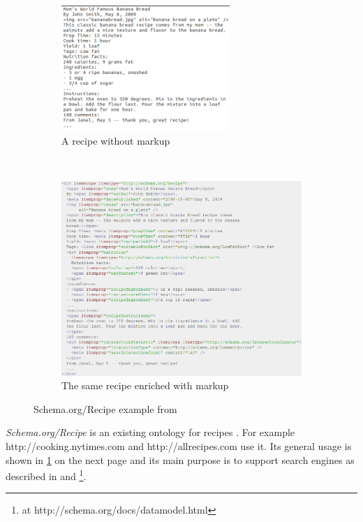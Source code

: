 \documentclass[12pt, twoside]{report}
\begin{document}
\begin{figure}
	\begin{subfigure}{1\textwidth}
		\centering
		\includegraphics[width=0.7\textwidth]{Images/schemaRecipeWithoutMarkup}
		\caption{A recipe without markup}\vspace{1em}
	\end{subfigure} \\
	\begin{subfigure}{1\textwidth}
		\centering
		\includegraphics[width=1\textwidth]{Images/schemaRecipeWithMarkup}
		\caption{The same recipe enriched with markup}
	\end{subfigure}
	\caption{Schema.org/Recipe example from \parencite{schemaOrg}}
	\label{fig:schemaOrgRecipe}
\end{figure}

\textit{Schema.org/Recipe} is an existing ontology for recipes \parencite{schemaOrg}. For example http://cooking.nytimes.com and http://allrecipes.com use it. Its general usage is shown in \cref{fig:schemaOrgRecipe} on the next page and its main purpose is to support search engines as described in \parencite{foodBlogger} and \parencite{schemaOrg} \footnote{at http://schema.org/docs/datamodel.html}.
\end{document}
